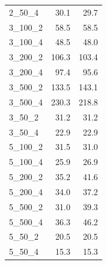 \begin{tabular}{lrr}
  2\_50\_4 &                                               30.1 &                                               29.7 \\
 3\_100\_2 &                                               58.5 &                                               58.5 \\
 3\_100\_4 &                                               48.5 &                                               48.0 \\
 3\_200\_2 &                                              106.3 &                                              103.4 \\
 3\_200\_4 &                                               97.4 &                                               95.6 \\
 3\_500\_2 &                                              133.5 &                                              143.1 \\
 3\_500\_4 &                                              230.3 &                                              218.8 \\
  3\_50\_2 &                                               31.2 &                                               31.2 \\
  3\_50\_4 &                                               22.9 &                                               22.9 \\
 5\_100\_2 &                                               31.5 &                                               31.0 \\
 5\_100\_4 &                                               25.9 &                                               26.9 \\
 5\_200\_2 &                                               35.2 &                                               41.6 \\
 5\_200\_4 &                                               34.0 &                                               37.2 \\
 5\_500\_2 &                                               31.0 &                                               39.3 \\
 5\_500\_4 &                                               36.3 &                                               46.2 \\
  5\_50\_2 &                                               20.5 &                                               20.5 \\
  5\_50\_4 &                                               15.3 &                                               15.3 \\
\bottomrule
\end{tabular}
